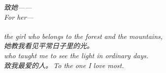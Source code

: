 
\begin{abstract}

\end{abstract}
\clearpage

\thispagestyle{empty}
\null\vfill
\begin{center}
\begin{minipage}{0.74\linewidth}
\centering\itshape\color{rose}
{\cjk 致她——}\\[0.3em]
For her---\\[0.7em]
\\[0.2em]
the girl who belongs to the forest and the mountains,\\[0.5em]
{\cjk 她教我看见平常日子里的光。}\\[0.2em]
who taught me to see the light in ordinary days.\\[1.0em]
{\upshape\footnotesize\color{gold} {\cjk 致我最爱的人。}\,\;To the one I love most.}
\end{minipage}
\end{center}
\vfill\null
\clearpage


